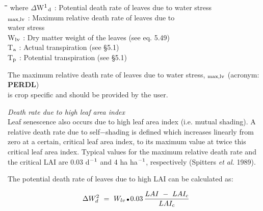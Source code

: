 \documentclass[11pt]{article}
\begin{document}
\nwln
\begin{tabbing}
\hspace{1.27cm}\=\hspace{1.27cm}\=\hspace{1.27cm}\=\hspace{1.27cm}\=%
\hspace{1.27cm}\=\hspace{1.27cm}\=\hspace{1.27cm}\=\hspace{1.27cm}\=%
\hspace{1.27cm}\=\hspace{1.27cm}\=\kill
where\> $\Delta$W$^{{\rm 1}}$$_{{\rm d}}$\> : Potential death rate of leaves due to water stress \> \> \> \> \> \> \> \> [kg  ha$^{{\rm -1}}$ d$^{{\rm -1}}$]\\
\>\dag $_{{\rm max,lv}}$\> : Maximum relative death rate of leaves due to\\
\>\>   water stress\> \> \> \> \> \> \> \> [kg kg$^{{\rm -1}}$ d$^{{\rm -1}}$]\\
\>W$_{{\rm lv}}$\> : Dry matter weight of the leaves (see eq. 5.49)\> \> \> \> \> \> \> \> [kg ha$^{{\rm -1}}$]\\
\>T$_{{\rm a}}$\> : Actual transpiration (see \S 5.1)\> \> \> \> \> \> \> \> [cm d$^{{\rm -1}}$]\\
\>T$_{{\rm p}}$\> : Potential transpiration (see \S 5.1)\> \> \> \> \> \> \> \> [cm d$^{{\rm -1}}$]
\end{tabbing}

 \bigskip
The maximum relative death rate of leaves due to water stress, {\bf \dag $_{{\rm max,lv}}$} (acronym: {\bf PERDL})\\
is crop specific and should be provided by the user.

\bigskip
\bigskip
{\it Death rate due to high leaf area index\/}\\
Leaf senescence also occurs due to high leaf area index (i.e. mutual shading). A relative
death rate due to self$-$shading is defined which increases linear\-ly from zero at a certain,
critical leaf area index, to its maximum value at twice this critical leaf area index. Typical
values for the maximum relative death rate and the critical LAI are 0.03 d$^{{\rm -1}}$ and 4 ha ha$^{{\rm -}{1}}$,
respectively (Spitters {\it et al.\/} 1989).

\bigskip
\bigskip
\bigskip
 The potential death rate of leaves due to high LAI can be calculated as:

\begin{displaymath}
\Delta W _{d}^{2} ~=~ W _{lv} \, {\rm \Bullet{0.75ex}}\, 0.03\,{\frac{ LAI ~-~ LAI _{c} }{LAI _{c} }}
\end{displaymath}
\end{document}
